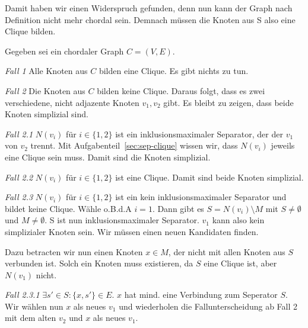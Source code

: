 Damit haben wir einen Widerspruch gefunden, denn nun kann der Graph nach Definition nicht mehr chordal sein.
Demnach müssen die Knoten aus S also eine Clique bilden.

\subexercise

Gegeben sei ein chordaler Graph $C = (V,E)$.

\emph{Fall 1}
Alle Knoten aus $C$ bilden eine Clique. Es gibt nichts zu tun.

\emph{Fall 2}
Die Knoten aus $C$ bilden keine Clique. Daraus folgt, dass es zwei verschiedene, nicht adjazente Knoten $v_1, v_2$ gibt.
Es bleibt zu zeigen, dass beide Knoten simplizial sind.

\emph{Fall 2.1}
$N(v_i)$ für $i \in \{1,2\}$ ist ein inklusionsmaximaler Separator, der der $v_1$ von $v_2$ trennt.
Mit Aufgabenteil~\ref{sec:sep-clique} wissen wir, dass $N(v_i)$ jeweils eine Clique sein muss. Damit sind die Knoten simplizial.

\emph{Fall 2.2}
$N(v_i)$ für $i \in \{1,2\}$ ist eine Clique. Damit sind beide Knoten simplizial.

\emph{Fall 2.3}
$N(v_i)$ für $i \in \{1,2\}$ ist ein kein inklusionsmaximaler Separator und bildet keine Clique. Wähle o.B.d.A $i = 1$.
Dann gibt es $S = N(v_i) \setminus M$ mit $S \neq \emptyset$ und $M \neq \emptyset$. S ist nun inklusionsmaximaler Separator.
$v_1$ kann also kein simplizialer Knoten sein. Wir müssen einen neuen Kandidaten finden.

Dazu betracten wir nun einen Knoten $x \in M$, der nicht mit allen Knoten aus $S$ verbunden ist. Solch ein Knoten muss existieren, da $S$ eine Clique ist, aber $N(v_1)$ nicht.

\emph{Fall 2.3.1}
$\exists s' \in S \colon \{x,s'\} \in E$. $x$ hat mind. eine Verbindung zum Seperator $S$.
Wir wählen nun $x$ als neues $v_1$ und wiederholen die Fallunterscheidung ab Fall 2 mit dem alten $v_2$ und $x$ als neues $v_1$.

